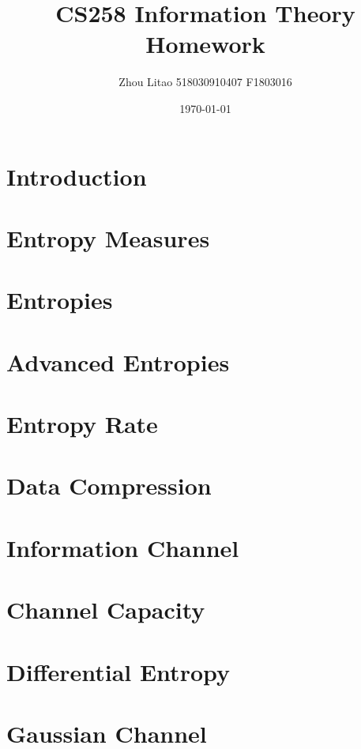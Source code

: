 \documentclass{article}
\title{CS258 Information Theory Homework}
\author{Zhou Litao 518030910407 F1803016}
\date{\today}
\numberwithin{algorithm}{section}
\begin{document}
\maketitle

\section{Introduction}


\section{Entropy Measures}


\section{Entropies}


\section{Advanced Entropies}


\section{Entropy Rate}


\section{Data Compression}


\section{Information Channel}


\section{Channel Capacity}


\section{Differential Entropy}


\section{Gaussian Channel}

\end{document}
